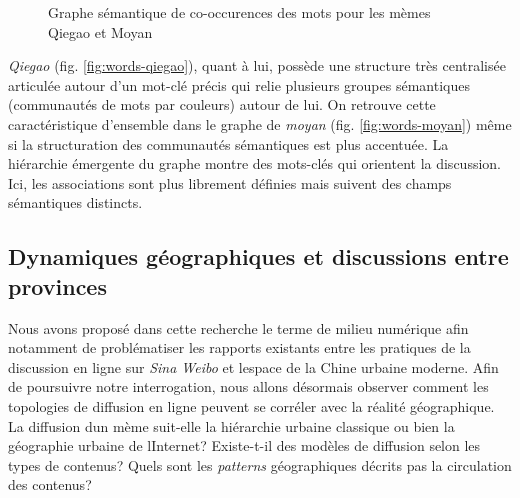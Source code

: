 \begin{figure}[htbp]
    \centering
    
  \caption{
    Graphe sémantique de co-occurences des mots pour les mèmes Qiegao et Moyan
  }
\end{figure}


\textit{Qiegao} (fig. \ref{fig:words-qiegao}), quant \`a lui, possède une structure très centralisée articulée autour d{\textquoteright}un mot-clé précis qui relie plusieurs groupes sémantiques (communautés de mots par couleurs) autour de lui. On retrouve cette caractéristique d{\textquoteright}ensemble dans le graphe de \textit{moyan} (fig. \ref{fig:words-moyan}) même si la structuration des communautés sémantiques est plus accentuée. La hiérarchie émergente du graphe montre des mots-clés qui orientent la discussion. Ici, les associations sont plus librement définies mais suivent des champs sémantiques distincts.


\subsection[Dynamiques géographiques et discussions entre provinces]{Dynamiques géographiques et discussions entre provinces}

Nous avons proposé dans cette recherche le terme de milieu numérique afin notamment de problématiser les rapports existants entre les pratiques de la discussion en ligne sur \textit{Sina Weibo} et l{\textquotesingle}espace de la Chine urbaine moderne. Afin de poursuivre notre interrogation, nous allons désormais observer comment les topologies de diffusion en ligne peuvent se corréler avec la réalité géographique. La diffusion d{\textquotesingle}un mème suit-elle la hiérarchie urbaine classique ou bien la géographie urbaine de l{\textquotesingle}Internet? Existe-t-il des modèles de diffusion selon les types de contenus? Quels sont les \textit{patterns }géographiques décrits pas la circulation des contenus? 

